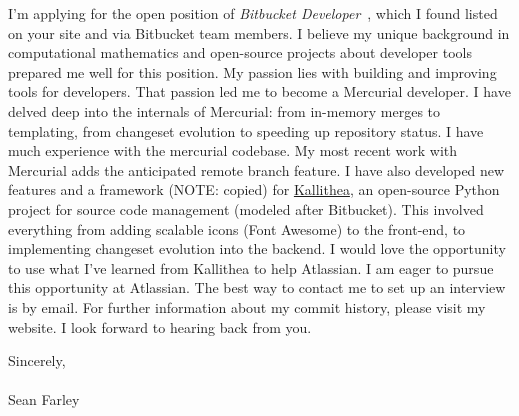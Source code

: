 \documentclass[]{fancy-cv}
\newcommand\company{Atlassian}
\newcommand\position{\emph{Bitbucket Developer}}
\begin{document}
I'm applying for the open position of \position~, which I found listed on your
site and via Bitbucket team members. I believe my unique background in
computational mathematics and open-source projects about developer tools
prepared me well for this position.
%
\newline\newline
%
My passion lies with building and improving tools for developers. That passion
led me to become a Mercurial developer. I have delved deep into the internals
of Mercurial: from in-memory merges to templating, from changeset evolution to
speeding up repository status. I have much experience with the mercurial
codebase. My most recent work with Mercurial adds the anticipated remote
branch feature.
%
\newline\newline
%
I have also developed new features and a framework (NOTE: copied) for
\href{https://kallithea-scm.org}{Kallithea}, an open-source Python project for
source code management (modeled after Bitbucket). This involved everything from
adding scalable icons (Font Awesome) to the front-end, to implementing
changeset evolution into the backend. I would love the opportunity to use what
I've learned from Kallithea to help \company.
%
\newline\newline
%
I am eager to pursue this opportunity at \company. The best way to contact me
to set up an interview is by email. For further information about my commit
history, please visit my website. I look forward to hearing back from you.

\vspace{2em}
Sincerely,\\
\\
Sean Farley
\end{document}
